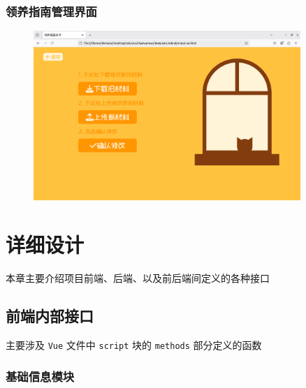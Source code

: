 \documentclass[12pt,a4paper,UTF8]{article}
\begin{document}
\subsubsection{领养指南管理界面}

\begin{figure}[H]
  \centering
  \includegraphics[width=0.9\textwidth]{figures/Guide.png}
\end{figure}

\section{详细设计} \label{a}

本章主要介绍项目前端、后端、以及前后端间定义的各种接口 

\subsection{前端内部接口}

主要涉及 \verb|Vue| 文件中 \verb|script| 块的 \verb|methods| 部分定义的函数

\subsubsection{基础信息模块}
\end{document}
